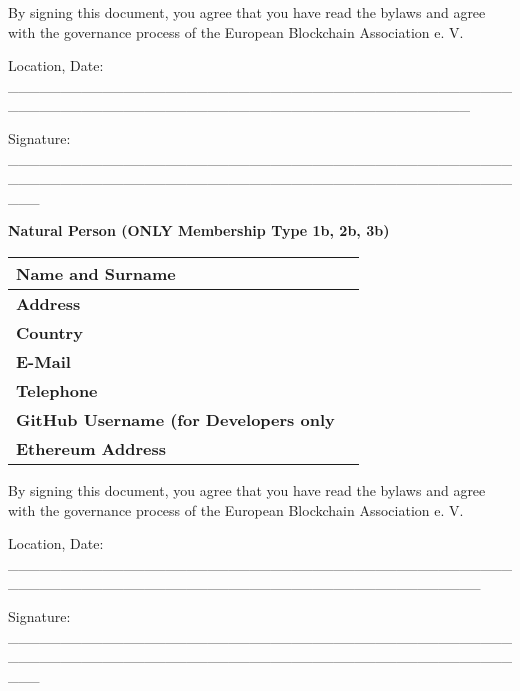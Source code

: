 \documentclass{article}
\begin{document}
By signing this document, you agree that you have read the bylaws and agree with the governance process of the European Blockchain Association e. V.

\vspace{2cm}

Location, Date: \_\_\_\_\_\_\_\_\_\_\_\_\_\_\_\_\_\_\_\_\_\_\_\_\_\_\_\_\_\_\_\_\_\_\_\_\_\_\_\_\_\_\_\_\_\_\_\_\_\_\_\_\_\_\_\_\_\_\_\_\_\_\_\_\_\_\_\_\_\_\_\_\_\_\_\_\_\_\_\_\_\_\_\_\_\_\_\_\_\_\_\_

\vspace{2cm}

Signature: \_\_\_\_\_\_\_\_\_\_\_\_\_\_\_\_\_\_\_\_\_\_\_\_\_\_\_\_\_\_\_\_\_\_\_\_\_\_\_\_\_\_\_\_\_\_\_\_\_\_\_\_\_\_\_\_\_\_\_\_\_\_\_\_\_\_\_\_\_\_\_\_\_\_\_\_\_\_\_\_\_\_\_\_\_\_\_\_\_\_\_\_\_\_\_\_\_\_\_

\newpage

\textbf{Natural Person (ONLY Membership Type 1b, 2b, 3b)}
\begin{longtable}{| p{} | p{} |}
	\hline
	\newline 
	\textbf{Name and Surname} \newline & \\
	\hline	
	\newline 
	\textbf{Address} \newline & \\
	\hline	
	\newline 
	\textbf{Country} \newline & \\
	\hline
	\newline 
	\textbf{E-Mail} \newline & \\
	\hline	
	\newline 
	\textbf{Telephone} \newline & \\
	\hline
	\newline 
	\textbf{GitHub Username (for Developers only} \newline & \\
	\hline	
	\newline 
	\textbf{Ethereum Address} \newline & \\
	\hline	
\end{longtable}
\vspace{3cm}


By signing this document, you agree that you have read the bylaws and agree with the governance process of the European Blockchain Association e. V.

\vspace{2cm}

Location, Date: \_\_\_\_\_\_\_\_\_\_\_\_\_\_\_\_\_\_\_\_\_\_\_\_\_\_\_\_\_\_\_\_\_\_\_\_\_\_\_\_\_\_\_\_\_\_\_\_\_\_\_\_\_\_\_\_\_\_\_\_\_\_\_\_\_\_\_\_\_\_\_\_\_\_\_\_\_\_\_\_\_\_\_\_\_\_\_\_\_\_\_\_\_

\vspace{2cm}

Signature: \_\_\_\_\_\_\_\_\_\_\_\_\_\_\_\_\_\_\_\_\_\_\_\_\_\_\_\_\_\_\_\_\_\_\_\_\_\_\_\_\_\_\_\_\_\_\_\_\_\_\_\_\_\_\_\_\_\_\_\_\_\_\_\_\_\_\_\_\_\_\_\_\_\_\_\_\_\_\_\_\_\_\_\_\_\_\_\_\_\_\_\_\_\_\_\_\_\_\_	
\end{document}
